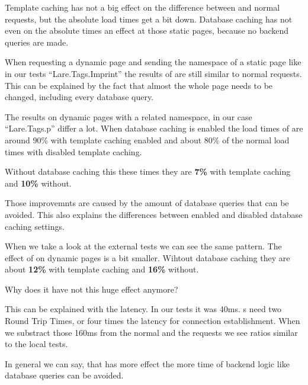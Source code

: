 Template caching has not a big effect on the difference between \lare{} and normal requests, but the absolute load times get a bit down.
Database caching has not even on the absolute times an effect at those static pages, because no backend queries are made.

When requesting a dynamic page and sending the namespace of a static page like in our tests \enquote{Lare.Tags.Imprint} the results of \lare{} are still similar to normal requests.
This can be explained by the fact that almost the whole page needs to be changed, including every database query.

The results on dynamic pages with a related namespace, in our case \enquote{Lare.Tags.p} differ a lot.
When database caching is enabled the load times of \lare{} are around 90\% with template caching enabled and about 80\% of the normal load times with disabled template caching.

Without database caching this these times they are \textbf{7\%} with template caching and \textbf{10\%} without.

Those improvemnts are caused by the amount of database queries that can be avoided. This also explains the differences between enabled and disabled database caching settings.

When we take a look at the external tests we can see the same pattern.
The effect of \lare{} on dynamic pages is a bit smaller.
Wihtout database caching they are about \textbf{12\%} with template caching and \textbf{16\%} without.

Why does it have not this huge effect anymore?

This can be explained with the latency.
In our tests it was 40ms.
\httpRequest{}s need two Round Trip Times, or four times the latency for connection establishment.
When we substract those 160ms from the normal and the \lare{} requests we see ratios similar to the local tests.

In general we can say, that \lare{} has more effect the more time of backend logic like database queries can be avoided.

\newpage{}

